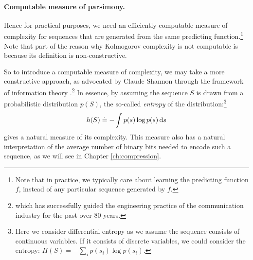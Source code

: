 \documentclass[\toplevelprefix/book-main.tex]{subfiles}
\begin{document}
\paragraph{Computable measure of parsimony.}
Hence for practical purposes, we need an efficiently computable measure of complexity for sequences that are generated from the same predicting function.\footnote{Note that in practice, we typically care about learning the predicting function $f$, instead of any particular sequence generated by $f$.} Note that part of the reason why Kolmogorov complexity is not computable is because its definition is non-constructive.

So to introduce a computable measure of complexity, we may take a more constructive approach, as advocated by Claude Shannon through the framework of information theory \cite{Shannon-1948,Cover-Thomas}.\footnote{which has successfully guided the engineering practice of the communication industry for the past over 80 years.} In essence, by assuming the sequence $S$ is drawn from a probabilistic distribution $p(S)$, the so-called {\em entropy} of the distribution:\footnote{Here we consider differential entropy as we assume the sequence consists of continuous variables. If it consists of discrete variables, we could consider the entropy: $H(S) = - \sum_{i}p(s_i) \log p(s_i).$ }
\begin{equation}
    h(S) \doteq -\int p(s) \log p(s) \odif{s}
    \label{eqn:entropy-definition}
\end{equation}
gives a natural measure of its complexity. This measure also has a natural interpretation of the average number of binary bits needed to encode such a sequence, as we will see in Chapter \ref{ch:compression}.
\end{document}
